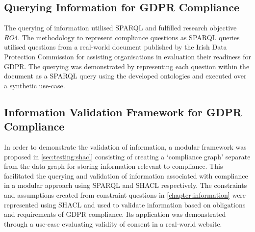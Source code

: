 \subsection{Querying Information for GDPR Compliance}
The querying of information utilised SPARQL and fulfilled research objective $RO4$.
The methodology to represent compliance questions as SPARQL queries utilised questions from a real-world document published by the Irish Data Protection Commission for assisting organisations in evaluation their readiness for GDPR.
The querying was demonstrated by representing each question within the document as a SPARQL query using the developed ontologies and executed over a synthetic use-case.

\subsection{Information Validation Framework for GDPR Compliance}
In order to demonstrate the validation of information, a modular framework was proposed in \autoref{sec:testing:shacl} consisting of creating a `compliance graph' separate from the data graph for storing information relevant to compliance.
This facilitated the querying and validation of information associated with compliance in a modular approach using SPARQL and SHACL respectively.
The constraints and assumptions created from constraint questions in \autoref{chapter:information} were represented using SHACL and used to validate information based on obligations and requirements of GDPR compliance.
Its application was demonstrated through a use-case evaluating validity of consent in a real-world website.

